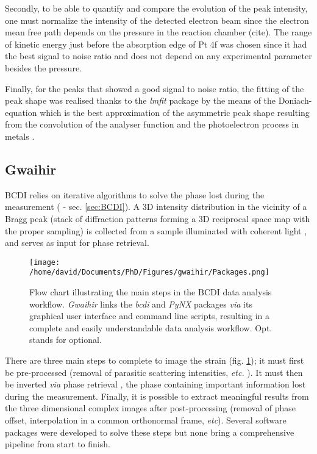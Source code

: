 Secondly, to be able to quantify and compare the evolution of the peak intensity, one must normalize the intensity of the detected electron beam since the electron mean free path depends on the pressure in the reaction chamber (cite).
The range of kinetic energy just before the absorption edge of Pt 4f was chosen since it had the best signal to noise ratio and does not depend on any experimental parameter besides the pressure.

Finally, for the peaks that showed a good signal to noise ratio, the fitting of the peak shape was realised thanks to the \textit{lmfit} \parencite{Newville2016} package by the means of the Doniach-equation which is the best approximation of the asymmetric peak shape resulting from the convolution of the analyser function and the photoelectron process in metals \parencite{Doniach_1970}.

\subsection{Gwaihir} \label{sec:Gwaihir}

BCDI relies on iterative algorithms to solve the phase lost during the measurement (\cite{robinson_coherent_2009} - sec. \ref{sec:BCDI}).
A 3D intensity distribution in the vicinity of a Bragg peak (stack of diffraction patterns forming a 3D reciprocal space map with the proper sampling) is collected from a sample illuminated with coherent light \parencite{robinson_coherent_2005}, and serves as input for phase retrieval.

\begin{figure}[!htb]
    \texttt{[image: /home/david/Documents/PhD/Figures/gwaihir/Packages.png]}
    \caption{Flow chart illustrating the main steps in the BCDI data analysis workflow. \textit{Gwaihir} links the \textit{bcdi} and \textit{PyNX} packages \textit{via} its graphical user interface and command line scripts, resulting in a complete and easily understandable data analysis workflow. Opt. stands for optional.
    }
    \label{fig:Packages}
\end{figure}

There are three main steps to complete to image the strain (fig. \ref{fig:Packages}); it must first be pre-processed (removal of parasitic scattering intensities, \textit{etc.} \parencite{ozturk_performance_2017}).
It must then be inverted \textit{via} phase retrieval \parencite{miao_possible_2000}, the phase containing important information lost during the measurement.
Finally, it is possible to extract meaningful results from the three dimensional complex images after post-processing (removal of phase offset, interpolation in a common orthonormal frame, \textit{etc}).
Several software packages were developed to solve these steps but none bring a comprehensive pipeline from start to finish.

